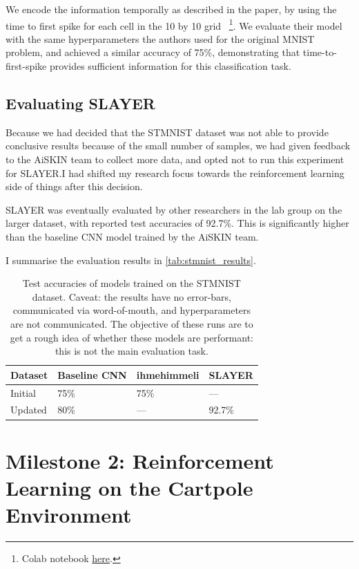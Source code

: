 \documentclass[fyp]{socreport}
\begin{document}
We encode the information temporally as described in the paper, by using the
time to first spike for each cell in the 10 by 10 grid
~\cite{comsa19_tempor_codin_spikin_neural_networ}\footnote{Colab notebook
\href{https://colab.research.google.com/drive/144bSlbCXV8Rce0mAvq42byq3alMW7PXl}{here}.}. We
evaluate their model with the same hyperparameters the authors used for the
original MNIST problem, and achieved a similar accuracy of 75\%, demonstrating
that time-to-first-spike provides sufficient information for this classification
task.

\subsection{Evaluating SLAYER}

Because we had decided that the STMNIST dataset was not able to provide
conclusive results because of the small number of samples, we had given feedback
to the AiSKIN team to collect more data, and opted not to run this experiment
for SLAYER.\@ I had shifted my research focus towards the reinforcement learning
side of things after this decision.

SLAYER was eventually evaluated by other researchers in the lab group on the
larger dataset, with reported test accuracies of 92.7\%. This is significantly
higher than the baseline CNN model trained by the AiSKIN team.

I summarise the evaluation results in \autoref{tab:stmnist_results}.

\begin{table}[htbp]
\caption{\label{tab:stmnist_results} Test accuracies of models trained on the
STMNIST dataset. Caveat: the results have no error-bars, communicated via
word-of-mouth, and hyperparameters are not communicated. The objective of these
runs are to get a rough idea of whether these models are performant: this is not
the main evaluation task.}  \centering
\begin{tabular}{llll}
  \toprule
  Dataset & Baseline CNN & ihmehimmeli & SLAYER \\
  \midrule Initial & 75\% & 75\% & --- \\
  Updated & 80\% & --- & 92.7\%\\
  \bottomrule
\end{tabular}
\end{table}


\section{Milestone 2: Reinforcement Learning on the Cartpole Environment}
\end{document}
